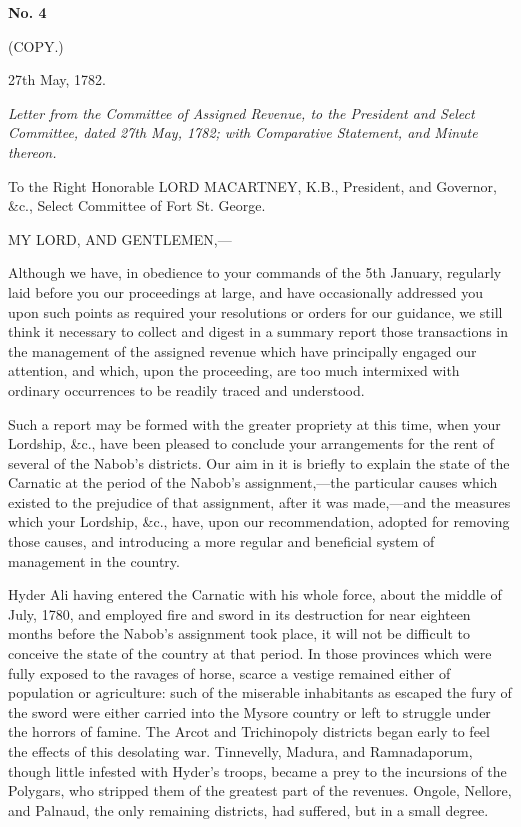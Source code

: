 \PRLsep
\begin{center}
  \textbf{\large No. 4} \par 
\end{center}


\centerline{(COPY.)}

\hfill 27th May, 1782.

\noindent
\textit{Letter from the Committee of Assigned Revenue, to the President and Select Committee, dated 27th May, 1782; with Comparative Statement, and Minute thereon.}
\vspace{0.3cm}

\noindent
To the Right Honorable LORD MACARTNEY, K.B., President, and Governor, \&c., Select Committee of Fort St. George.
\vspace{0.3cm}

\noindent
MY LORD, AND GENTLEMEN,—

Although we have, in obedience to your commands of the 5th January, regularly laid before you our proceedings at large, and have occasionally addressed you upon such points as required your resolutions or orders for our guidance, we still think it necessary to collect and digest in a summary report those transactions in the management of the assigned revenue which have principally engaged our attention, and which, upon the proceeding, are too much intermixed with ordinary occurrences to be readily traced and understood.

Such a report may be formed with the greater propriety at this time, when your Lordship, \&c., have been pleased to conclude your arrangements for the rent of several of the Nabob's districts. Our aim in it is briefly to explain the state of the Carnatic at the period of the Nabob's assignment,—the particular causes which existed to the prejudice of that assignment, after it was made,—and the measures which your Lordship, \&c., have, upon our recommendation, adopted for removing those causes, and introducing a more regular and beneficial system of management in the country.

Hyder Ali having entered the Carnatic with his whole force, about the middle of July, 1780, and employed fire and sword in its destruction for near eighteen months before the Nabob's assignment took place, it will not be difficult to conceive the state of the country at that period. In those provinces which were fully exposed to the ravages of horse, scarce a vestige remained either of population or agriculture: such of the miserable inhabitants as escaped the fury of the sword were either carried into the Mysore country or left to struggle under the horrors of famine. The Arcot and Trichinopoly districts began early to feel the effects of this desolating war. Tinnevelly, Madura, and Ramnadaporum, though little infested with Hyder's troops, became a prey to the incursions of the Polygars, who stripped them of the greatest part of the revenues. Ongole, Nellore, and Palnaud, the only remaining districts, had suffered, but in a small degree.


